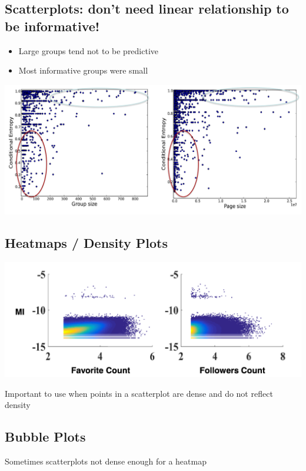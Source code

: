 \documentclass[11pt]{article}
\theoremstyle{definition}
\begin{document}
\subsection{Scatterplots: don’t need linear relationship to
be informative!}
\begin{itemize}
  \item Large groups tend not to be predictive
  \item Most informative groups were small
\end{itemize}
\includegraphics[width=\textwidth]{25.png}

\subsection{Heatmaps / Density Plots}
\includegraphics[width=\textwidth]{26.png}

Important to use when points in a scatterplot
are dense and do not reflect density

\subsection{Bubble Plots}
Sometimes scatterplots not
dense enough for a heatmap
\end{document}
